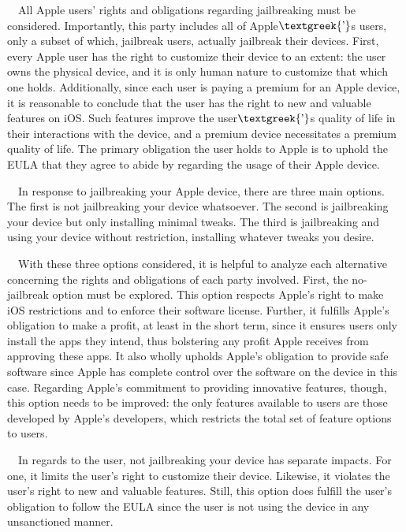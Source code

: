 \documentclass{article}
\begin{document}
\bigskip

\ \ All Apple users' rights and obligations regarding jailbreaking must be considered. Importantly, this party includes
all of Apple$\text{\textgreek{’}}$s users, only a subset of which, jailbreak users, actually jailbreak their devices.
First, every Apple user has the right to customize their device to an extent: the user owns the physical device, and it
is only human nature to customize that which one holds. Additionally, since each user is paying a premium for an Apple
device, it is reasonable to conclude that the user has the right to new and valuable features on iOS. Such features
improve the user$\text{\textgreek{’}}$s quality of life in their interactions with the device, and a premium device
necessitates a premium quality of life. The primary obligation the user holds to Apple is to uphold the EULA that they
agree to abide by regarding the usage of their Apple device.

\ \ In response to jailbreaking your Apple device, there are three main options. The first is not jailbreaking your
device whatsoever. The second is jailbreaking your device but only installing minimal tweaks. The third is jailbreaking
and using your device without restriction, installing whatever tweaks you desire.

\ \ With these three options considered, it is helpful to analyze each alternative concerning the rights and obligations
of each party involved. First, the no-jailbreak option must be explored. This option respects Apple's right to make iOS
restrictions and to enforce their software license. Further, it fulfills Apple's obligation to make a profit, at least
in the short term, since it ensures users only install the apps they intend, thus bolstering any profit Apple receives
from approving these apps. It also wholly upholds Apple's obligation to provide safe software since Apple has complete
control over the software on the device in this case. Regarding Apple's commitment to providing innovative features,
though, this option needs to be improved: the only features available to users are those developed by Apple's
developers, which restricts the total set of feature options to users.

\ \ In regards to the user, not jailbreaking your device has separate impacts. For one, it limits the user's right to
customize their device. Likewise, it violates the user's right to new and valuable features. Still, this option does
fulfill the user's obligation to follow the EULA since the user is not using the device in any unsanctioned manner.
\end{document}
